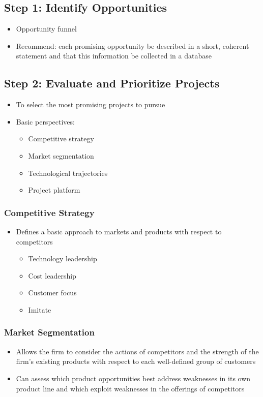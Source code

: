 \documentclass[a4paper,12pt,openany]{book}
\begin{document}
\subsection{Step 1: Identify Opportunities}
\begin{itemize}
    \item Opportunity funnel
    \item Recommend: each promising opportunity be described in a short, coherent statement and that this information be collected in a database
\end{itemize}

\subsection{Step 2: Evaluate and Prioritize Projects}
\begin{itemize}
    \item To select the most promising projects to pursue
    \item Basic perspectives:
    \begin{itemize}
        \item Competitive strategy
        \item Market segmentation 
        \item Technological trajectories
        \item Project platform
    \end{itemize}
\end{itemize}
\subsubsection{Competitive Strategy}
\begin{itemize}
    \item Defines a basic approach to markets and products with respect to competitors
    \begin{itemize}
        \item Technology leadership
        \item Cost leadership
        \item Customer focus
        \item Imitate
    \end{itemize}
\end{itemize}
\subsubsection{Market Segmentation}
\begin{itemize}
    \item Allows the firm to consider the actions of competitors and the strength of the firm’s existing products with respect to each well-defined group of customers
    \item Can assess which product opportunities best address weaknesses in its own product line and which exploit weaknesses in the offerings of competitors
\end{itemize}
\end{document}
